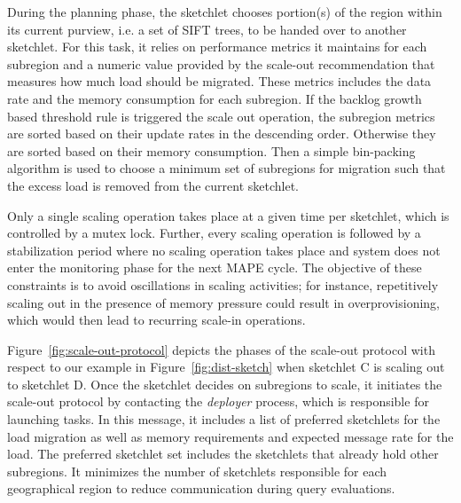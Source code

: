 During the planning phase, the sketchlet chooses portion(s) of the region within its current purview, i.e. a set of SIFT trees, to be handed over to another sketchlet.
For this task, it relies on performance metrics it maintains for each subregion and a numeric value provided by the scale-out recommendation that measures how much load should be migrated.
These metrics includes the data rate and the memory consumption for each subregion.
If the backlog growth based threshold rule is triggered the scale out operation, the subregion metrics are sorted based on their update rates in the descending order. Otherwise they are sorted based on their memory consumption.
Then a simple bin-packing algorithm is used to choose a minimum set of subregions for migration such that the excess load is removed from the current sketchlet.

Only a single scaling operation takes place at a given time per sketchlet, which is controlled by a mutex lock.
Further, every scaling operation is followed by a stabilization period where no scaling operation takes place and system does not enter the monitoring phase for the next MAPE cycle.
The objective of these constraints is to avoid oscillations in scaling activities; for instance, repetitively scaling out in the presence of memory pressure could result in overprovisioning, which would then lead to recurring scale-in operations.
%

Figure~\ref{fig:scale-out-protocol} depicts the phases of the scale-out protocol with respect to our example in Figure~\ref{fig:dist-sketch} when sketchlet C is scaling out to sketchlet D.
Once the sketchlet decides on subregions to scale, it initiates the scale-out protocol by contacting the \emph{deployer} process, which is responsible for launching tasks.
In this message, it includes a list of preferred sketchlets for the load migration as well as memory requirements and expected message rate for the load.
The preferred sketchlet set includes the sketchlets that already hold other subregions.
It minimizes the number of sketchlets responsible for each geographical region to reduce communication during query evaluations.

